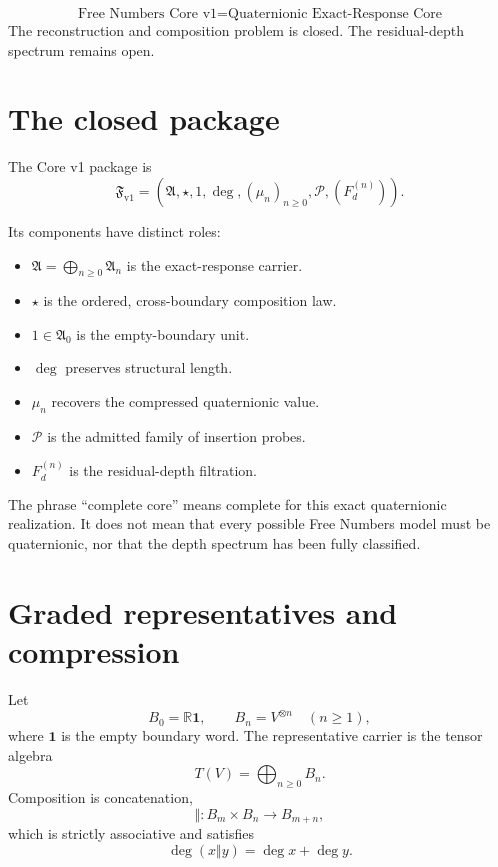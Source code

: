 \documentclass[11pt,a4paper]{article}
\newcommand{\RR}{\mathbb R}
\newcommand{\Fn}{\mathfrak F_{\mathrm{v1}}}
\newcommand{\An}{\mathfrak A}
\newcommand{\st}{\star}
\newcommand{\degf}{\operatorname{deg}}
\begin{document}
\begin{theorembox}
\[
\boxed{
\text{Free Numbers Core v1}
=
\text{Quaternionic Exact-Response Core}
}
\]
The reconstruction and composition problem is closed. The residual-depth spectrum remains open.
\end{theorembox}

\section{The closed package}

The Core v1 package is
\[
\boxed{
\Fn
=
\left(
\An,
\st,
1,
\degf,
(\mu_n)_{n\ge0},
\mathcal P,
(F_d^{(n)})
\right).
}
\]

Its components have distinct roles:

\begin{itemize}
\item $\An=\bigoplus_{n\ge0}\mathfrak A_n$ is the exact-response carrier.
\item $\st$ is the ordered, cross-boundary composition law.
\item $1\in\mathfrak A_0$ is the empty-boundary unit.
\item $\degf$ preserves structural length.
\item $\mu_n$ recovers the compressed quaternionic value.
\item $\mathcal P$ is the admitted family of insertion probes.
\item $F_d^{(n)}$ is the residual-depth filtration.
\end{itemize}

\begin{scopebox}
The phrase ``complete core'' means complete for this exact quaternionic realization. It does not mean that every possible Free Numbers model must be quaternionic, nor that the depth spectrum has been fully classified.
\end{scopebox}

\section{Graded representatives and compression}

Let
\[
B_0=\RR\mathbf 1,
\qquad
B_n=V^{\otimes n}\quad(n\ge1),
\]
where $\mathbf 1$ is the empty boundary word. The representative carrier is the tensor algebra
\[
T(V)=\bigoplus_{n\ge0}B_n.
\]
Composition is concatenation,
\[
\Vert:B_m\times B_n\longrightarrow B_{m+n},
\]
which is strictly associative and satisfies
\[
\degf(x\Vert y)=\degf x+\degf y.
\]
\end{document}
